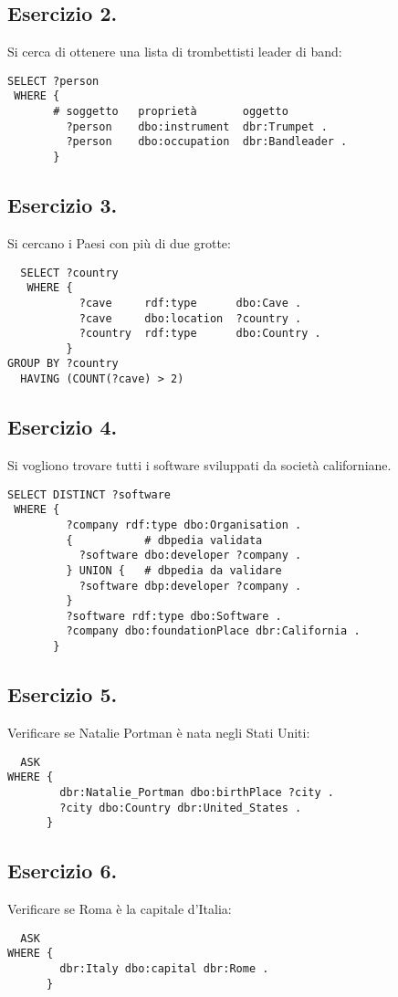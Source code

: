 \documentclass[11pt]{article}
\begin{document}
\subsection*{Esercizio 2.}
Si cerca di ottenere una lista di trombettisti leader di band:
\begin{verbatim}
SELECT ?person
 WHERE {
       # soggetto   proprietà       oggetto
         ?person    dbo:instrument  dbr:Trumpet .
         ?person    dbo:occupation  dbr:Bandleader .
       }
\end{verbatim}

\subsection*{Esercizio 3.}
Si cercano i Paesi con più di due grotte:
\begin{verbatim}
  SELECT ?country
   WHERE {
           ?cave     rdf:type      dbo:Cave .
           ?cave     dbo:location  ?country .
           ?country  rdf:type      dbo:Country .
         }
GROUP BY ?country
  HAVING (COUNT(?cave) > 2)
\end{verbatim}

\subsection*{Esercizio 4.}
Si vogliono trovare tutti i software sviluppati da società californiane.
\begin{verbatim}
SELECT DISTINCT ?software
 WHERE {
         ?company rdf:type dbo:Organisation .
         {           # dbpedia validata
           ?software dbo:developer ?company .
         } UNION {   # dbpedia da validare
           ?software dbp:developer ?company .
         }
         ?software rdf:type dbo:Software .
         ?company dbo:foundationPlace dbr:California .
       }
\end{verbatim}

\subsection*{Esercizio 5.}
Verificare se Natalie Portman è nata negli Stati Uniti:
\begin{verbatim}
  ASK
WHERE {
        dbr:Natalie_Portman dbo:birthPlace ?city .
        ?city dbo:Country dbr:United_States .
      }
\end{verbatim}

\subsection*{Esercizio 6.}
Verificare se Roma è la capitale d'Italia:
\begin{verbatim}
  ASK 
WHERE {
        dbr:Italy dbo:capital dbr:Rome .
      }
\end{verbatim}
\end{document}
